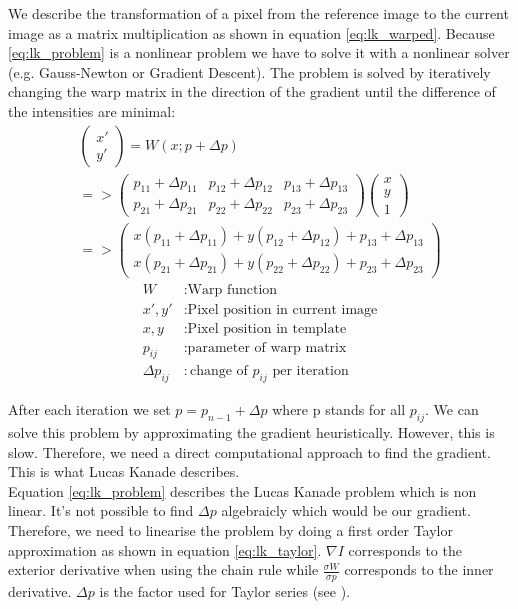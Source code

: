 \documentclass[11pt,a4paper,titlepage,oneside]{report}
\begin{document}
We describe the transformation of a pixel from the reference image to the current image as a matrix multiplication as shown in equation \ref{eq:lk_warped}. Because \ref{eq:lk_problem} is a nonlinear problem we have to solve it with a nonlinear solver (e.g. Gauss-Newton or Gradient Descent). The problem is solved by iteratively changing the warp matrix in the direction of the gradient until the difference of the intensities are minimal:
\begin{equation}\label{eq:lk_warped}
  \begin{gathered}
    \begin{pmatrix}
      x' \\
      y'
    \end{pmatrix}=
    W(x;p+\Delta p)\\
    =>
    \begin{pmatrix}
      p_{11}+\Delta p_{11} & p_{12}+\Delta p_{12} & p_{13}+\Delta p_{13} \\
      p_{21}+\Delta p_{21} & p_{22}+\Delta p_{22} & p_{23}+\Delta p_{23}
    \end{pmatrix}
    \begin{pmatrix}
      x\\
      y\\
      1
    \end{pmatrix}\\
    =>
    \begin{pmatrix}
      x(p_{11}+\Delta p_{11}) + y(p_{12}+\Delta p_{12}) + p_{13}+\Delta p_{13} \\
      x(p_{21}+\Delta p_{21}) + y(p_{22}+\Delta p_{22}) + p_{23}+\Delta p_{23}
    \end{pmatrix}
  \end{gathered}
\end{equation}
\begin{align*}
  W								&: \text{Warp function}\\
  x',y'           &: \text{Pixel position in current image}\\
  x,y             &: \text{Pixel position in template}\\
  p_{ij}          &: \text{parameter of warp matrix}\\
  \Delta p_{ij}   &: \text{change of $p_{ij}$ per iteration}
\end{align*}

After each iteration we set $p=p_{n-1}+\Delta p$ where p stands for all $p_{ij}$. We can solve this problem by approximating the gradient heuristically. However, this is slow. Therefore, we need a direct computational approach to find the gradient. This is what Lucas Kanade describes.\\
Equation \ref{eq:lk_problem} describes the Lucas Kanade problem which is non linear. It's not possible to find $\Delta p$ algebraicly which would be our gradient. Therefore, we need to linearise the problem by doing a first order Taylor approximation as shown in equation \ref{eq:lk_taylor}. $\nabla I$ corresponds to the exterior derivative when using the chain rule while $\frac{\sigma W}{\sigma p}$ corresponds to the inner derivative. $\Delta p$ is the factor used for Taylor series (see \cite{taylor_series}).
\end{document}
